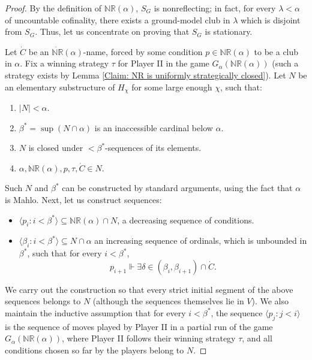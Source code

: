 \documentclass[11pt]{amsart}
\theoremstyle{definition}
\newcounter{condition}
\theoremstyle{remark}
\newcommand\<{{<}}
\newcommand{\la}{\langle}
\newcommand{\ra}{\rangle}
\begin{document}
    \begin{proof}
        By the definition of $\mathbb{NR}(\alpha)$, $S_G$ is nonreflecting; in fact, for every $\lambda<\alpha$ of uncountable cofinality, there exists a ground-model club in $\lambda$ which is  disjoint from $S_G$. Thus, let us concentrate on proving that $S_G$ is stationary.
        
        Let $\dot{C}$ be an $\dot{\mathbb{NR}}(\alpha)$-name, forced by some condition $p\in \mathbb{NR}(\alpha)$ to be a club in $\alpha$. Fix a winning strategy $\tau$ for Player II in the game $G_\alpha(\mathbb{NR}(\alpha))$ (such a strategy exists by Lemma \ref{Claim: NR is uniformly strategically closed}). Let $N$ be an elementary substructure of $H_{\chi}$ for some large enough $\chi$, such that:
        \begin{enumerate}
            \item $|N|< \alpha$.
            \item $\beta^* = \sup(N\cap \alpha)$ is an inaccessible cardinal below $\alpha$.
            \item $N$ is closed under $<\beta^*$-sequences of its elements.
            \item $\alpha, \mathbb{NR}(\alpha), p, \tau , \dot{C}\in N$.
        \end{enumerate}
        Such $N$ and $\beta^*$ can be constructed by standard arguments, using the fact that $\alpha$ is Mahlo. Next, let us construct sequences:
        \begin{itemize}
            \item $\la p_i \colon i<\beta^* \ra\subseteq \mathbb{NR}(\alpha)\cap N$, a decreasing sequence of conditions. 
            \item $\la \beta_i \colon i<\beta^* \ra\subseteq N\cap \alpha$ an increasing sequence of ordinals, which is unbounded in $\beta^*$, such that for every $i<\beta^*$,
            $$p_{i+1}\Vdash \exists \delta\in (\beta_{i}, \beta_{i+1})\cap \dot{C}.$$
        \end{itemize}
        
        We carry out the construction so that every strict initial segment of the above sequences belongs to $N$ (although the sequences themselves lie in $V$). We also maintain the inductive assumption that for every $i<\beta^*$, the sequence $\langle p_j \colon j<i\rangle$ is the sequence of moves played by Player II in a partial run of the game $G_\alpha(\mathbb{NR}(\alpha))$, where Player II follows their winning strategy $\tau$, and all conditions chosen so far by the players belong to $N$.


\end{proof}
\end{document}
